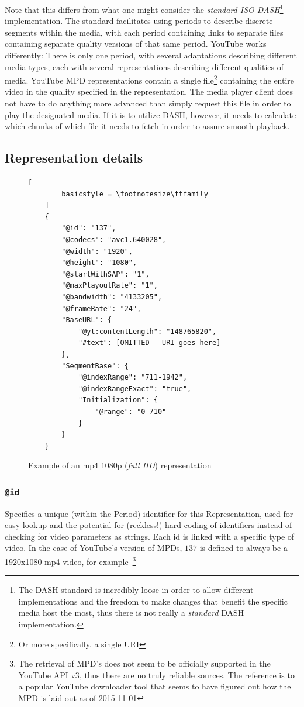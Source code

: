 Note that this differs from what one might consider the \textit{standard ISO
DASH}\footnote{The DASH standard is incredibly loose in order to allow different
implementations and the freedom to make changes that benefit the specific media
host the most, thus there is not really a \textit{standard} DASH implementation.}
implementation. The standard facilitates using periods to
describe discrete segments within the media, with each period containing links
to separate files containing separate quality versions of that same period.
YouTube works differently: There is only one period, with several adaptations
describing different media types, each with several representations describing
different qualities of media. YouTube MPD representations contain a single file\footnote{Or more specifically, a single URI}
containing the entire video in the quality specified in the representation.
The media player client does not have to do anything more advanced than simply
request this file in order to play the designated media. If it is to utilize
DASH, however, it needs to calculate which chunks of which file it needs to
fetch in order to assure smooth playback.

\subsection{Representation details}

\begin{figure}
    \centering
    \begin{lstlisting}[
        basicstyle = \footnotesize\ttfamily
    ]
    {
        "@id": "137",
        "@codecs": "avc1.640028",
        "@width": "1920",
        "@height": "1080",
        "@startWithSAP": "1",
        "@maxPlayoutRate": "1",
        "@bandwidth": "4133205",
        "@frameRate": "24",
        "BaseURL": {
            "@yt:contentLength": "148765820",
            "#text": [OMITTED - URI goes here]
        },
        "SegmentBase": {
            "@indexRange": "711-1942",
            "@indexRangeExact": "true",
            "Initialization": {
                "@range": "0-710"
            }
        }
    }
    \end{lstlisting}
    \caption{Example of an mp4 1080p (\textit{full HD}) representation}
    \label{fig:dash-1080p-representation}
\end{figure}

\subsubsection{\texttt{@id}}
Specifies a unique (within the Period) identifier for this Representation, used
for easy lookup and the
potential for (reckless!) hard-coding of identifiers instead of checking for
video parameters as strings.
Each id is linked with a specific type of video. In the case of
YouTube's version of MPDs, $137$ is defined to always be a 1920x1080 mp4 video, for
example~\cite[line 303]{youtube-dl:youtube.py}\footnote{The retrieval of MPD's
does not seem to be officially supported in the YouTube API v3, thus there are
no truly reliable sources. The reference is to a popular YouTube downloader tool
that seems to have figured out how the MPD is laid out as of 2015-11-01}

